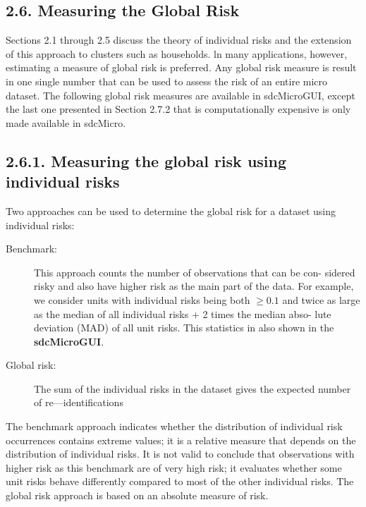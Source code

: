 
\subsection*{2.6. Measuring the Global Risk}

Sections 2.1 through 2.5 discuss the theory of individual risks and the extension
of this approach to clusters such as households. ln many applications, however,
estimating a measure of global risk is preferred. Any global risk measure is result
in one single number that can be used to assess the risk of an entire micro dataset.
The following global risk measures are available in sdcMicroGUI, except the last
one presented in Section 2.7.2 that is computationally expensive is only made
available in sdcMicro.
\subsection*{2.6.1. Measuring the global risk using individual risks}
Two approaches can be used to determine the global risk for a dataset using
individual risks:
\begin{description}
	\item[Benchmark:] This approach counts the number of observations that can be con-
	sidered risky and also have higher risk as the main part of the data. For
	example, we consider units with individual risks being both $\geq 0.1$ and twice
	as large as the median of all individual risks + 2 times the median abso-
	lute deviation (MAD) of all unit risks. This statistics in also shown in the
	\textbf{sdcMicroGUI}.
	
	\item[Global risk:] The sum of the individual risks in the dataset gives the expected
	number of re—identiﬁcations
	
\end{description}
The benchmark approach indicates whether the distribution of individual risk
occurrences contains extreme values; it is a relative measure that depends on the
distribution of individual risks. It is not valid to conclude that observations with
higher risk as this benchmark are of very high risk; it evaluates whether some
unit risks behave differently compared to most of the other individual risks. The
global risk approach is based on an absolute measure of risk. 

